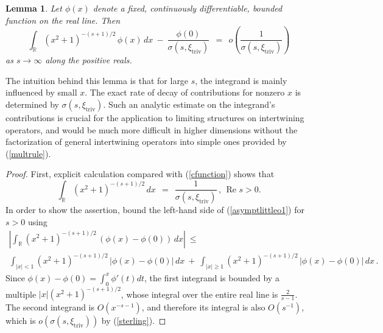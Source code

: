 \documentclass[12pt]{article}
\newtheorem{lem}[equation]{Lemma}
\numberwithin{equation}{section}
\newcommand\f{\frac}
\newcommand{\R}{{\mathbb{R}}}
\renewcommand\Re{\text{Re~}}
\renewcommand\i{^{-1}}
\renewcommand\({\left(}
\renewcommand\){\right)}
\begin{document}
\begin{lem}\label{lem:asymptconcentration}
Let $\phi(x)$ denote a fixed, continuously differentiable,  bounded function on the real line.  Then
\begin{equation}\label{asymptlittleo1}
  \int_{\R}(x^2+1)^{-(s+1)/2}\,\phi(x)\,dx  \ - \  \frac{\phi(0)}{\sigma(s,\xi_\text{triv})}  \ \ = \ \ o\(\frac{1}{\sigma(s,\xi_\text{triv})}\)
\end{equation}
as $s\rightarrow\infty$ along the positive reals.
\end{lem}

\noindent The intuition behind this lemma is that for large $s$, the integrand is mainly influenced by small $x$.  The exact rate of decay of contributions for nonzero $x$ is determined by $\sigma(s,\xi_\text{triv})$.  Such an analytic estimate on the integrand's contributions is crucial for the application to limiting structures on intertwining operators, and would be much more difficult in higher dimensions without the factorization of general intertwining operators into simple ones provided by (\ref{multrule}).
\begin{proof}
First, explicit calculation compared with  (\ref{cfunction}) shows that
\begin{equation}\label{evalintegral}
  \int_\R(x^2+1)^{-(s+1)/2}\,dx \ \ = \ \ \frac{1}{\sigma(s,\xi_\text{triv})} \,, \ \ \Re{s}>0.
\end{equation}
In order to show the assertion, bound the left-hand side of (\ref{asymptlittleo1}) for $s>0$ using
\begin{multline}\label{asymptlittleo2}
  \left| \int_{\R}(x^2+1)^{-(s+1)/2}\,(\phi(x)-\phi(0))\,dx \right| \ \le   \\   \int_{|x|< 1}(x^2+1)^{-(s+1)/2}\,|\phi(x)-\phi(0)|\,dx \ + \ \int_{|x|\ge 1}(x^2+1)^{-(s+1)/2}\,|\phi(x)-\phi(0)|\,dx\,.
\end{multline}
Since $\phi(x)-\phi(0)=\int_0^x \phi'(t)dt$, the first integrand is bounded by a multiple $|x|(x^2+1)^{-(s+1)/2}$, whose integral over the entire real line is $\f{2}{s-1}$.  The second integrand is $O(x^{-s-1})$, and therefore its integral is also $O(s\i)$, which is  $o(\sigma(s,\xi_\text{triv}))$ by (\ref{sterling}).
\end{proof}
\end{document}
